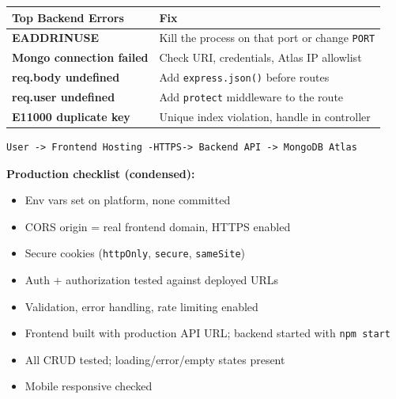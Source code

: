 \begin{tabularx}{\textwidth}{@{}>{\bfseries}p{3cm}X@{}}
\toprule
Top Backend Errors & Fix \\
\midrule
EADDRINUSE & Kill the process on that port or change \texttt{PORT} \\
Mongo connection failed & Check URI, credentials, Atlas IP allowlist \\
req.body undefined & Add \texttt{express.json()} before routes \\
req.user undefined & Add \texttt{protect} middleware to the route \\
E11000 duplicate key & Unique index violation, handle in controller \\
\bottomrule
\end{tabularx}

\begin{diagrambox}
\begin{verbatim}
User -> Frontend Hosting -HTTPS-> Backend API -> MongoDB Atlas
\end{verbatim}
\end{diagrambox}

\textbf{Production checklist (condensed):}
\begin{itemize}
\item[$\square$] Env vars set on platform, none committed
\item[$\square$] CORS origin = real frontend domain, HTTPS enabled
\item[$\square$] Secure cookies (\texttt{httpOnly}, \texttt{secure},
\texttt{sameSite})
\item[$\square$] Auth + authorization tested against deployed URLs
\item[$\square$] Validation, error handling, rate limiting enabled
\item[$\square$] Frontend built with production API URL; backend started
with \texttt{npm start}
\item[$\square$] All CRUD tested; loading/error/empty states present
\item[$\square$] Mobile responsive checked
\end{itemize}
